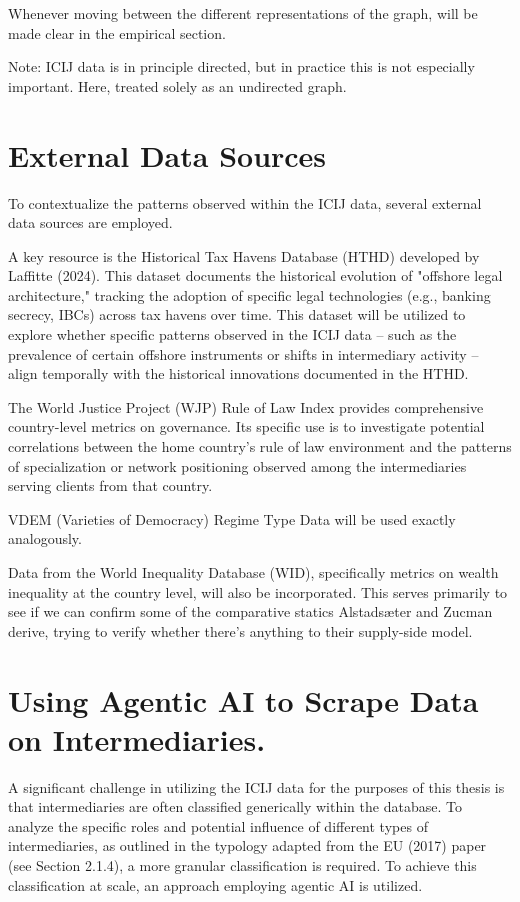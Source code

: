 Whenever moving between the different representations of the graph, will be made clear in the empirical section.


Note: ICIJ data is in principle directed, but in practice this is not especially important. Here, treated solely as an undirected graph.

\section{External Data Sources}

\label{sec:3_2}

To contextualize the patterns observed within the ICIJ data, several external data sources are employed.

A key resource is the Historical Tax Havens Database (HTHD) developed by Laffitte (2024). This dataset documents the historical evolution of "offshore legal architecture," tracking the adoption of specific legal technologies (e.g., banking secrecy, IBCs) across tax havens over time. This dataset will be utilized to explore whether specific patterns observed in the ICIJ data – such as the prevalence of certain offshore instruments or shifts in intermediary activity – align temporally with the historical innovations documented in the HTHD.

The World Justice Project (WJP) Rule of Law Index provides comprehensive country-level metrics on governance. Its specific use is to investigate potential correlations between the home country's rule of law environment and the patterns of specialization or network positioning observed among the intermediaries serving clients from that country.

VDEM (Varieties of Democracy) Regime Type Data will be used exactly analogously.

Data from the World Inequality Database (WID), specifically metrics on wealth inequality at the country level, will also be incorporated.  This serves primarily to see if we can confirm some of the comparative statics Alstadsæter and Zucman derive, trying to verify whether there's anything to their supply-side model.

\section{Using Agentic AI to Scrape Data on Intermediaries.}
\label{sec:3_3}

A significant challenge in utilizing the ICIJ data for the purposes of this thesis is that intermediaries are often classified generically within the database. To analyze the specific roles and potential influence of different types of intermediaries, as outlined in the typology adapted from the EU (2017) paper (see Section 2.1.4), a more granular classification is required. To achieve this classification at scale, an approach employing agentic AI is utilized.

